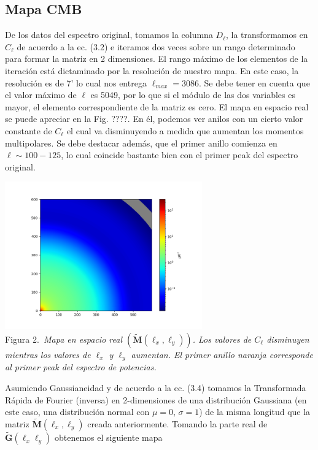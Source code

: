 \documentclass[twocolumn,letterpaper,spanish]{revtex4}
\numberwithin{equation}{section}
\begin{document}
\subsection{Mapa CMB}

De los datos del espectro original, tomamos la columna $D_{\ell}$, la transformamos en $C_{\ell}$ de acuerdo a la ec. (3.2) e iteramos dos veces sobre un rango determinado para formar la matriz en 2 dimensiones. El rango m\'aximo de los elementos de la iteraci\'on est\'a dictaminado por la resoluci\'on de nuestro mapa. En este caso, la resoluci\'on es de 7' lo cual nos entrega $\ell_{max}=3086$. Se debe tener en cuenta que el valor m\'aximo de $\ell$ es 5049, por lo que si el m\'odulo de las dos variables es mayor, el elemento correspondiente de la matriz es cero. El mapa en espacio real se puede apreciar en la Fig. ????. En \'el, podemos ver anilos con un cierto valor constante de $C_{\ell}$ el cual va disminuyendo a medida que aumentan los momentos multipolares.
Se debe destacar adem\'as, que el primer anillo comienza en $\ell\sim 100-125$, lo cual coincide bastante bien con el primer peak del espectro original.

\begin{center}
   \includegraphics[width=85mm]{M_tilde.png}\\
   Figura 2.\emph{\ Mapa en espacio real $(\tilde{\mathbf{M}}(\ell_x, \ell_y))$. Los valores de $C_{\ell}$ disminuyen mientras los valores de $\ell_x$ y $\ell_y$ aumentan. El primer anillo naranja corresponde al primer peak del espectro de potencias.}
\end{center}

Asumiendo Gaussianeidad y de acuerdo a la ec. (3.4) tomamos la Transformada R\'apida de Fourier (inversa) en 2-dimensiones de una distribuci\'on Gaussiana (en este caso, una distribuci\'on normal con $\mu=0$, $\sigma=1$) de la misma longitud que la matriz $\tilde{\mathbf{M}}(\ell_x, \ell_y)$ creada anteriormente. Tomando la parte real de $\tilde{\mathbf{G}}(\ell_x \ell_y)$ obtenemos el siguiente mapa
\end{document}
